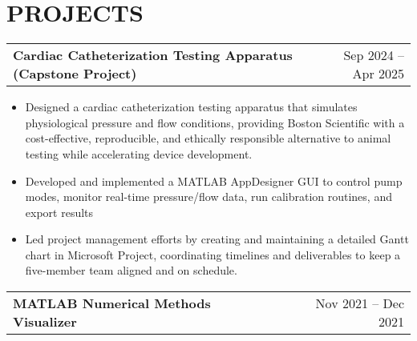 \documentclass[a4paper,10pt]{article}
\begin{document}
\section{PROJECTS}
\begin{tabularx}{\linewidth}{@{}X r@{}}
\begin{minipage}[t]{\linewidth}
  \textbf{Cardiac Catheterization Testing Apparatus (Capstone Project)}
\end{minipage}
&     Sep 2024 -- Apr 2025
\end{tabularx}
\begin{itemize}[nosep,after=\strut, leftmargin=1em, itemsep=3pt,label=--]
  \item Designed a cardiac catheterization testing apparatus that simulates physiological pressure and flow conditions, providing Boston Scientific with a cost-effective, reproducible, and ethically responsible alternative to animal testing while accelerating device development.
\item Developed and implemented a MATLAB AppDesigner GUI to control pump modes, monitor real-time pressure/flow data, run calibration routines, and export results
\item Led project management efforts by creating and maintaining a detailed Gantt chart in Microsoft Project, coordinating timelines and deliverables to keep a five-member team aligned and on schedule.
\end{itemize}
\begin{tabularx}{\linewidth}{@{}X r@{}}
\begin{minipage}[t]{\linewidth}
  \textbf{MATLAB Numerical Methods Visualizer}
\end{minipage}
&     Nov 2021 -- Dec 2021
\end{tabularx}
\end{document}

